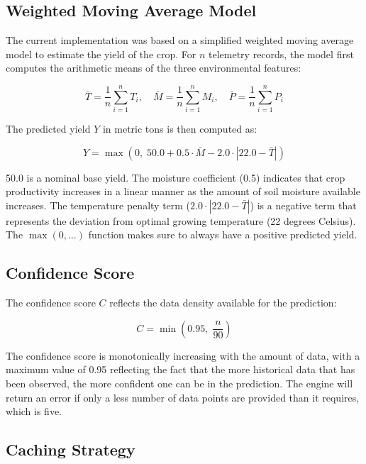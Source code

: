 \subsection{Weighted Moving Average Model}

The current implementation was based on a simplified weighted moving average model to estimate the yield of the crop. For $n$ telemetry records, the model first computes the arithmetic means of the three environmental features:

\begin{equation}
\bar{T} = \frac{1}{n} \sum_{i=1}^{n} T_i, \quad
\bar{M} = \frac{1}{n} \sum_{i=1}^{n} M_i, \quad
\bar{P} = \frac{1}{n} \sum_{i=1}^{n} P_i
\label{eq:averages}
\end{equation}

The predicted yield $Y$ in metric tons is then computed as:

\begin{equation}
Y = \max\left(0, \; 50.0 + 0.5 \cdot \bar{M} - 2.0 \cdot |22.0 - \bar{T}|\right)
\label{eq:yield}
\end{equation}

50.0 is a nominal base yield. The moisture coefficient (0.5) indicates that crop productivity increases in a linear manner as the amount of soil moisture available increases. The temperature penalty term ($2.0 \cdot |22.0 - \bar{T}|$) is a negative term that represents the deviation from optimal growing temperature (22 degrees Celsius). The $\max(0, \ldots)$ function makes sure to always have a positive predicted yield.

\subsection{Confidence Score}

The confidence score $C$ reflects the data density available for the prediction:

\begin{equation}
C = \min\left(0.95, \; \frac{n}{90}\right)
\label{eq:confidence}
\end{equation}

The confidence score is monotonically increasing with the amount of data, with a maximum value of 0.95 reflecting the fact that the more historical data that has been observed, the more confident one can be in the prediction. The engine will return an error if only a less number of data points are provided than it requires, which is five.

\subsection{Caching Strategy}

